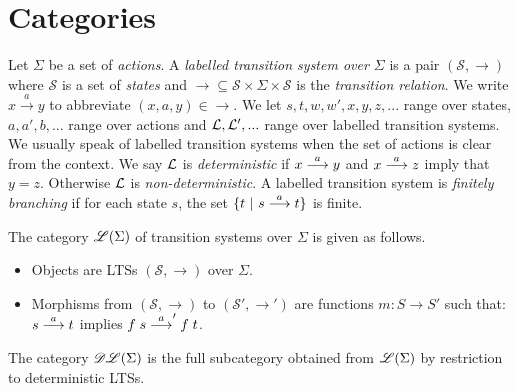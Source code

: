 \section{Categories}


Let $\Sigma$ be a set of \emph{actions}.  A \emph{labelled transition
  system over $\Sigma$} is a pair $(\mathcal{S}, \rightarrow)$ where
$\mathcal{S}$ is a set of \emph{states} and $\rightarrow \subseteq
\mathcal{S} \times \Sigma \times \mathcal{S}$ is the \emph{transition
  relation}.  We write $x \xrightarrow{a} y$ to abbreviate $(x,a,y)
\in \rightarrow$. We let $s, t, w, w', x, y, z, ...$ range over
states, $a, a', b, ...$ range over actions and $\mathcal{L}, \mathcal{L}', ...$
range over labelled transition systems. We usually speak of labelled
transition systems  when the set of actions is clear from the
context.  We say $\mathcal{L}$ is \emph{deterministic} if $x \stackrel{a}{\longrightarrow} y$ and
$x \stackrel{a}{\longrightarrow} z$ imply that $y = z$. Otherwise $\mathcal{L}$ is
\emph{non-deterministic}.  A labelled transition system is
\emph{finitely branching} if for each state $s$, the set $\{t\ |\ s
\stackrel{a}{\longrightarrow} t\}$ is finite.

\begin{definition}
The category ${\mathscr{L}(\Sigma)}$ of transition systems over $\Sigma$
is given as follows.

\begin{itemize}

\item Objects are LTSs $(\mathcal{S}, \rightarrow)$ over $\Sigma$.

\item Morphisms from $(\mathcal{S}, \rightarrow)$ to $(\mathcal{S}',
  \rightarrow')$ are functions $m : S \rightarrow S'$ such that:
     $s \stackrel{a}{\longrightarrow} t$ implies $f\; s \stackrel{a}{\longrightarrow}' f\; t$.

\end{itemize}

\NI The category ${\mathscr{DL}(\Sigma)}$ is the full subcategory obtained from
${\mathscr{L}(\Sigma)}$ by restriction to deterministic LTSs.
\end{definition}




